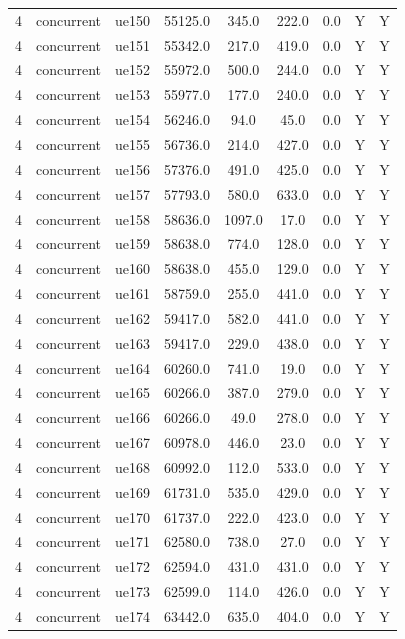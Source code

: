 \begin{table}[ht]
\begin{tabular}{|c|c|c|c|c|c|c|c|c|}
4 & concurrent & ue150 & 55125.0 & 345.0 & 222.0 & 0.0 & Y & Y \\
4 & concurrent & ue151 & 55342.0 & 217.0 & 419.0 & 0.0 & Y & Y \\
4 & concurrent & ue152 & 55972.0 & 500.0 & 244.0 & 0.0 & Y & Y \\
4 & concurrent & ue153 & 55977.0 & 177.0 & 240.0 & 0.0 & Y & Y \\
4 & concurrent & ue154 & 56246.0 & 94.0 & 45.0 & 0.0 & Y & Y \\
4 & concurrent & ue155 & 56736.0 & 214.0 & 427.0 & 0.0 & Y & Y \\
4 & concurrent & ue156 & 57376.0 & 491.0 & 425.0 & 0.0 & Y & Y \\
4 & concurrent & ue157 & 57793.0 & 580.0 & 633.0 & 0.0 & Y & Y \\
4 & concurrent & ue158 & 58636.0 & 1097.0 & 17.0 & 0.0 & Y & Y \\
4 & concurrent & ue159 & 58638.0 & 774.0 & 128.0 & 0.0 & Y & Y \\
4 & concurrent & ue160 & 58638.0 & 455.0 & 129.0 & 0.0 & Y & Y \\
4 & concurrent & ue161 & 58759.0 & 255.0 & 441.0 & 0.0 & Y & Y \\
4 & concurrent & ue162 & 59417.0 & 582.0 & 441.0 & 0.0 & Y & Y \\
4 & concurrent & ue163 & 59417.0 & 229.0 & 438.0 & 0.0 & Y & Y \\
4 & concurrent & ue164 & 60260.0 & 741.0 & 19.0 & 0.0 & Y & Y \\
4 & concurrent & ue165 & 60266.0 & 387.0 & 279.0 & 0.0 & Y & Y \\
4 & concurrent & ue166 & 60266.0 & 49.0 & 278.0 & 0.0 & Y & Y \\
4 & concurrent & ue167 & 60978.0 & 446.0 & 23.0 & 0.0 & Y & Y \\
4 & concurrent & ue168 & 60992.0 & 112.0 & 533.0 & 0.0 & Y & Y \\
4 & concurrent & ue169 & 61731.0 & 535.0 & 429.0 & 0.0 & Y & Y \\
4 & concurrent & ue170 & 61737.0 & 222.0 & 423.0 & 0.0 & Y & Y \\
4 & concurrent & ue171 & 62580.0 & 738.0 & 27.0 & 0.0 & Y & Y \\
4 & concurrent & ue172 & 62594.0 & 431.0 & 431.0 & 0.0 & Y & Y \\
4 & concurrent & ue173 & 62599.0 & 114.0 & 426.0 & 0.0 & Y & Y \\
4 & concurrent & ue174 & 63442.0 & 635.0 & 404.0 & 0.0 & Y & Y \\

\end{tabular}
\end{table}
